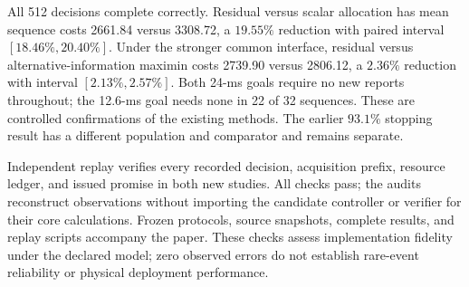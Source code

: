 All 512 decisions complete correctly. Residual versus scalar allocation has mean sequence costs 2661.84 versus 3308.72, a $19.55\%$ reduction with paired interval $[18.46\%,20.40\%]$. Under the stronger common interface, residual versus alternative-information maximin costs 2739.90 versus 2806.12, a $2.36\%$ reduction with interval $[2.13\%,2.57\%]$. Both 24-ms goals require no new reports throughout; the 12.6-ms goal needs none in 22 of 32 sequences. These are controlled confirmations of the existing methods. The earlier $93.1\%$ stopping result has a different population and comparator and remains separate.

Independent replay verifies every recorded decision, acquisition prefix, resource ledger, and issued promise in both new studies. All checks pass; the audits reconstruct observations without importing the candidate controller or verifier for their core calculations. Frozen protocols, source snapshots, complete results, and replay scripts accompany the paper. These checks assess implementation fidelity under the declared model; zero observed errors do not establish rare-event reliability or physical deployment performance.
